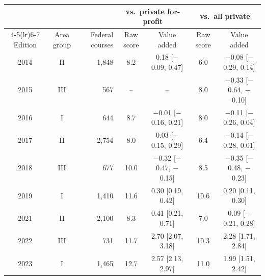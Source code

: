 \begin{tabular}{ccrcccc}
\toprule
 & & & \multicolumn{2}{c}{vs.\ private for-profit} & \multicolumn{2}{c}{vs.\ all private} \\
\cmidrule(lr){4-5}\cmidrule(lr){6-7}
Edition & Area group & Federal courses & Raw score & Value added & Raw score & Value added \\
\midrule
2014 & II & 1{,}848 & 8.2 & 0.18 [$-$0.09, 0.47] & 6.0 & $-$0.08 [$-$0.29, 0.14] \\
2015 & III & 567 & -- & -- & 8.0 & $-$0.33 [$-$0.64, $-$0.10] \\
2016 & I & 644 & 8.7 & $-$0.01 [$-$0.16, 0.21] & 8.0 & $-$0.11 [$-$0.26, 0.04] \\
2017 & II & 2{,}754 & 8.0 & 0.03 [$-$0.15, 0.29] & 6.4 & $-$0.14 [$-$0.28, 0.01] \\
2018 & III & 677 & 10.0 & $-$0.32 [$-$0.47, $-$0.15] & 8.5 & $-$0.35 [$-$0.48, $-$0.23] \\
2019 & I & 1{,}410 & 11.6 & 0.30 [0.19, 0.42] & 10.6 & 0.20 [0.11, 0.30] \\
2021 & II & 2{,}100 & 8.3 & 0.41 [0.21, 0.71] & 7.0 & 0.09 [$-$0.21, 0.28] \\
2022 & III & 731 & 11.7 & 2.70 [2.07, 3.18] & 10.3 & 2.28 [1.71, 2.84] \\
2023 & I & 1{,}465 & 12.7 & 2.57 [2.13, 2.97] & 11.0 & 1.99 [1.51, 2.42] \\
\bottomrule
\end{tabular}